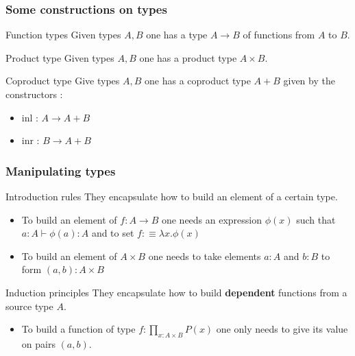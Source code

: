 \documentclass{beamer}
\begin{document}
        \begin{frame}
            \frametitle{Some constructions on types}
            \begin{exampleblock}{Function types}
                Given types $A,B$ one has a type $A \rightarrow B$ of functions from $A$ to $B$.
            \end{exampleblock}
            \pause
            \begin{exampleblock}{Product type}
                Given types $A,B$ one has a product type $A \times B$.
            \end{exampleblock}
            \pause
            \begin{exampleblock}{Coproduct type}
                Give types $A,B$ one has a coproduct type $A+B$ given by the constructors :
                \begin{itemize}
                    \item inl : $A \rightarrow A+B$
                    \item inr : $B \rightarrow A+B$
                  \end{itemize}
            \end{exampleblock}
        \end{frame}

        \begin{frame}
            \frametitle{Manipulating types}
            \begin{block}{Introduction rules}
                They encapsulate how to build an element of a certain type.
                \begin{itemize}
                    \item To build an element of $ f: A \rightarrow B$ one needs an expression $\phi(x)$ such that $a : A \vdash \phi(a) : A$ and to set $f :\equiv \lambda x. \phi(x)$
                    \item To build an element of $A \times B$ one needs to take elements $a : A$ and $b : B$ to form $(a,b) : A \times B$
                \end{itemize}
            \end{block}
            \pause
            \begin{block}{Induction principles}
                They encapsulate how to build \textbf{dependent} functions from a source type $A$.
                \begin{itemize}
                    \item To build a function of type $f : \prod_{x : A\times B} P(x)$ one only needs to give its value on pairs $(a,b)$. 
                \end{itemize}
            \end{block}
        \end{frame}
\end{document}
